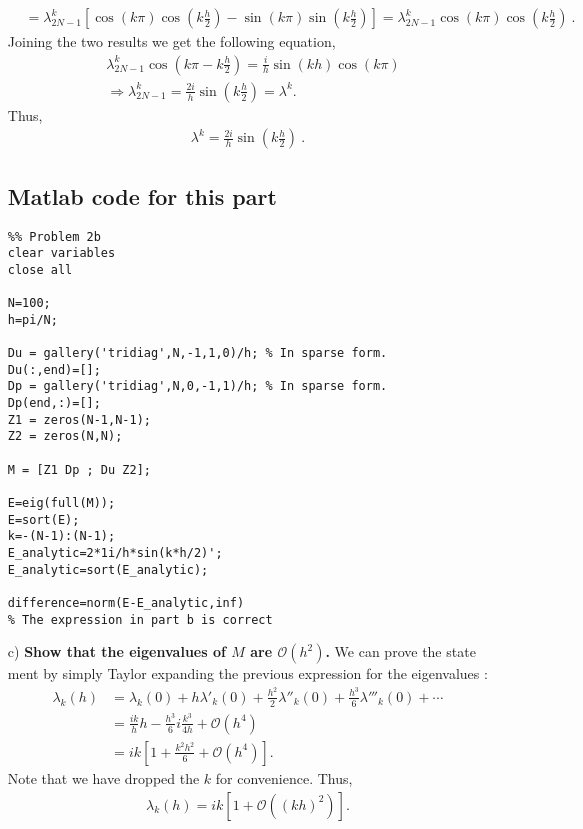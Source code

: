 \begin{enumerate}
\begin{align*}
& = \lambda^k_{2N-1}\left[\cos(k\pi)\cos\left(k\frac{h}{2}\right) - \sin(k\pi)\sin\left(k\frac{h}{2}\right)\right] = \lambda^k_{2N-1}\cos(k\pi)\cos\left(k\frac{h}{2}\right)~.
\end{align*}
Joining the two results we get the following equation,
\begin{align*}
& \lambda^k_{2N-1}\cos\left(k\pi - k\frac{h}{2}\right) = \frac{i}{h}\sin(kh)\cos(k\pi) \\
& \Rightarrow \lambda^k_{2N-1} = \frac{2i}{h}\sin\left(k\frac{h}{2}\right)=\lambda^k.
\end{align*}
Thus,
\begin{align*}
\boxed{\lambda^k= \frac{2i}{h}\sin\left(k\frac{h}{2}\right)}~.
\end{align*}
\subsection*{Matlab code for this part}
\begin{verbatim}
%% Problem 2b
clear variables
close all

N=100;
h=pi/N;

Du = gallery('tridiag',N,-1,1,0)/h; % In sparse form.
Du(:,end)=[];
Dp = gallery('tridiag',N,0,-1,1)/h; % In sparse form.
Dp(end,:)=[];
Z1 = zeros(N-1,N-1);
Z2 = zeros(N,N);

M = [Z1 Dp ; Du Z2];

E=eig(full(M));
E=sort(E);
k=-(N-1):(N-1);
E_analytic=2*1i/h*sin(k*h/2)';
E_analytic=sort(E_analytic); 

difference=norm(E-E_analytic,inf) 
% The expression in part b is correct
\end{verbatim}
\item[c)] \textbf{Show that the eigenvalues of $M$ are $\mathcal{O}(h^2)$.}
\proof We can prove the state ment by simply Taylor expanding the previous expression for the eigenvalues :
\begin{align*}
\lambda_k(h) &= \lambda_k(0) + h\lambda'_k(0) + \frac{h^2}{2}\lambda''_k(0) + \frac{h^3}{6} \lambda'''_k(0) + \cdots \\
& = \frac{ik}{h}h - \frac{h^3}{6}i\frac{k^3}{4h} + \mathcal{O}(h^4) \\
& = ik\left[ 1 + \frac{k^2h^2}{6} + \mathcal{O}(h^4) \right].
\end{align*}
Note that we have dropped the $k$ for convenience. Thus,
\begin{align*}
\lambda_k(h)  = ik\left[1 + \mathcal{O}((kh)^2)\right].
\end{align*}


\end{enumerate}
